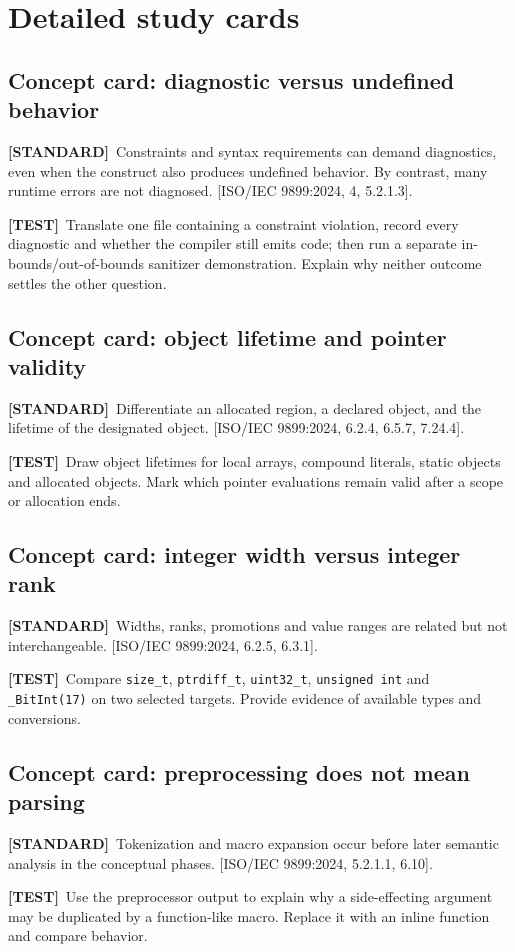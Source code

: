 \documentclass[10pt,letterpaper,oneside]{report}
\newcommand{\refcl}[1]{\textsf{\footnotesize[ISO/IEC 9899:2024, #1]}}
\newcommand{\standard}{\textbf{[STANDARD]}}
\newcommand{\testtag}{\textbf{[TEST]}}
\begin{document}
\chapter{Detailed study cards}
\section{Concept card: diagnostic versus undefined behavior}
\standard\ Constraints and syntax requirements can demand diagnostics, even when the construct also produces undefined behavior. By contrast, many runtime errors are not diagnosed. \refcl{4, 5.2.1.3}.\par
\testtag\ Translate one file containing a constraint violation, record every diagnostic and whether the compiler still emits code; then run a separate in-bounds/out-of-bounds sanitizer demonstration. Explain why neither outcome settles the other question.
\section{Concept card: object lifetime and pointer validity}
\standard\ Differentiate an allocated region, a declared object, and the lifetime of the designated object. \refcl{6.2.4, 6.5.7, 7.24.4}.\par
\testtag\ Draw object lifetimes for local arrays, compound literals, static objects and allocated objects. Mark which pointer evaluations remain valid after a scope or allocation ends.
\section{Concept card: integer width versus integer rank}
\standard\ Widths, ranks, promotions and value ranges are related but not interchangeable. \refcl{6.2.5, 6.3.1}.\par
\testtag\ Compare \texttt{size\_t}, \texttt{ptrdiff\_t}, \texttt{uint32\_t}, \texttt{unsigned int} and \texttt{\_BitInt(17)} on two selected targets. Provide evidence of available types and conversions.
\section{Concept card: preprocessing does not mean parsing}
\standard\ Tokenization and macro expansion occur before later semantic analysis in the conceptual phases. \refcl{5.2.1.1, 6.10}.\par
\testtag\ Use the preprocessor output to explain why a side-effecting argument may be duplicated by a function-like macro. Replace it with an inline function and compare behavior.
\end{document}
